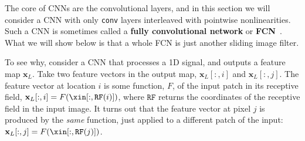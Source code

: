 

The core of CNNs are the convolutional layers, and in this section we will consider a CNN with only \texttt{conv} layers interleaved with pointwise nonlinearities. Such a CNN is sometimes called a \textbf{fully convolutional network} or \textbf{FCN}~\cite{FCNs}. What we will show below is that a whole FCN is just another sliding image filter.

To see why, consider a CNN that processes a 1D signal, and outputs a feature map $\mathbf{x}_L$. Take two feature vectors in the output map, $\mathbf{x}_L[:,i]$ and $\mathbf{x}_L[:,j]$. The feature vector at location $i$ is some function, $F$, of the input patch in its receptive field, $\mathbf{x}_L[:,i] = F(\xin[:,\texttt{RF}(i)])$, where $\texttt{RF}$ returns the coordinates of the receptive field in the input image. It turns out that the feature vector at pixel $j$ is produced by the \textit{same} function, just applied to a different patch of the input: $\mathbf{x}_L[:,j] = F(\xin[:,\texttt{RF}(j)])$.

